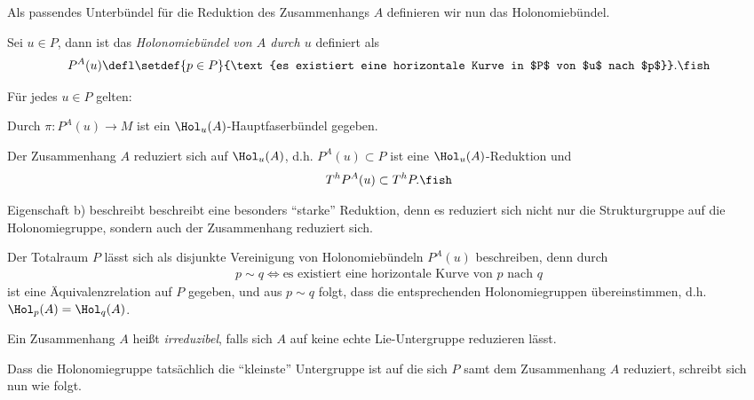 \documentclass[%
	paper=a5,%
	fleqn,%
	DIV=18,%
	BCOR=0mm,
	fontsize=11pt,
	titlepage=false,%
	bibliography=totoc,
	DIV=18,%
	twoside=true,
	pdftitle=Riemannsche Geometrie,
	pdfauthor=Uwe Semmelmann,
	numbers=noendperiod]%
	{scrbook}
\begin{document}
Als passendes Unterbündel für die Reduktion des Zusammenhangs $A$ definieren wir nun das Holonomiebündel.

\begin{defn}
Sei $u\in P$, dann ist das \emph{Holonomiebündel von $A$ durch $u$} definiert als
\begin{align*}
P^A(u) \defl \setdef{p\in P}{\text{es existiert eine horizontale Kurve in $P$ von $u$ nach $p$}}.\fish
\end{align*}
\end{defn}

\begin{prop}
Für jedes $u\in P$ gelten:
\begin{propenum}
\item Durch $\pi: P^A(u)\to M$ ist ein $\Hol_{u}(A)$-Hauptfaserbündel gegeben.
\item Der Zusammenhang $A$ reduziert sich auf $\Hol_{u}(A)$, d.h. $P^A(u)\subset P$ ist eine $\Hol_{u}(A)$-Reduktion und
\begin{align*}
T^hP^A(u) \subset T^hP.\fish
\end{align*}
\end{propenum}
\end{prop}

\begin{rem}[Bemerkungen.]
\begin{remenum}
\item Eigenschaft b) beschreibt beschreibt eine besonders ``starke'' Reduktion, denn es reduziert sich nicht nur die Strukturgruppe auf die Holonomiegruppe, sondern auch der Zusammenhang reduziert sich.
\item Der Totalraum $P$ lässt sich als disjunkte Vereinigung von Holonomiebündeln $P^A(u)$ beschreiben, denn durch
\begin{align*}
p\sim q \iff \text{es existiert eine horizontale Kurve von $p$ nach $q$}
\end{align*}
ist eine Äquivalenzrelation auf $P$ gegeben, und aus $p\sim q$ folgt, dass die entsprechenden Holonomiegruppen übereinstimmen, d.h. $\Hol_{p}(A) = \Hol_{q}(A)$.\map
\end{remenum}
\end{rem}

\begin{defn}
Ein Zusammenhang $A$ heißt \emph{irreduzibel}, falls sich $A$ auf keine echte Lie-Untergruppe reduzieren lässt.\fish
\end{defn}

Dass die Holonomiegruppe tatsächlich die ``kleinste'' Untergruppe ist auf die sich $P$ samt dem Zusammenhang $A$ reduziert, schreibt sich nun wie folgt.
\end{document}
